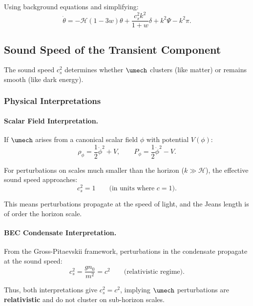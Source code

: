Using background equations and simplifying:
\begin{equation}
\dot{\theta} = -\mathcal{H}(1-3w)\theta + \frac{c_s^2 k^2}{1+w}\delta + k^2\Psi - k^2\pi.
\end{equation}

\subsection{Sound Speed of the Transient Component}
\label{sec:cs_mech}

The sound speed $c_s^2$ determines whether $\umech$ clusters (like matter) or remains smooth (like dark energy).

\subsubsection{Physical Interpretations}

\paragraph{Scalar Field Interpretation.}
If $\umech$ arises from a canonical scalar field $\phi$ with potential $V(\phi)$:
\begin{equation}
\rho_\phi = \frac{1}{2}\dot{\phi}^2 + V, \qquad P_\phi = \frac{1}{2}\dot{\phi}^2 - V.
\end{equation}

For perturbations on scales much smaller than the horizon ($k \gg \mathcal{H}$), the effective sound speed approaches:
\begin{equation}
c_s^2 = 1 \qquad \text{(in units where $c=1$)}.
\end{equation}

This means perturbations propagate at the speed of light, and the Jeans length is of order the horizon scale.

\paragraph{BEC Condensate Interpretation.}
From the Gross-Pitaevskii framework, perturbations in the condensate propagate at the sound speed:
\begin{equation}
c_s^2 = \frac{g n_0}{m^2} = c^2 \qquad \text{(relativistic regime)}.
\end{equation}

Thus, both interpretations give $c_s^2 = c^2$, implying $\umech$ perturbations are \textbf{relativistic} and do not cluster on sub-horizon scales.

